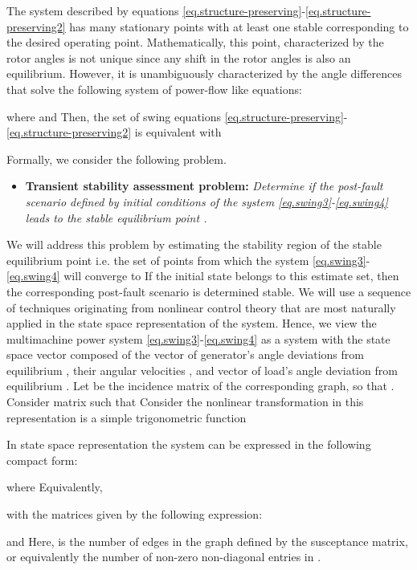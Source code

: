\documentclass[final]{IEEEtran}
\begin{document}
The system described by equations \eqref{eq.structure-preserving}-\eqref{eq.structure-preserving2} has many stationary points with
at least one stable corresponding to the desired operating point.
Mathematically, this point, characterized by the rotor angles
 is not unique
since any shift in the rotor angles
 is also an
equilibrium. However, it is unambiguously characterized by the
angle differences  that solve
the following system of power-flow like equations:

where  and 
Then, the set of swing equations \eqref{eq.structure-preserving}-\eqref{eq.structure-preserving2} is
equivalent with


Formally, we consider the following problem.

\begin{itemize}
\item [] \textbf{Transient stability assessment problem:} \emph{Determine if the post-fault scenario defined by
initial conditions  of the system \eqref{eq.swing3}-\eqref{eq.swing4} leads to the stable
equilibrium point .}
\end{itemize}




We will address this problem by estimating the stability region of the stable equilibrium point 
i.e. the set of points from which the system \eqref{eq.swing3}-\eqref{eq.swing4} will converge to  If the initial state  belongs to this estimate set,
then the corresponding post-fault scenario is determined stable.
We will use a sequence of techniques
originating from nonlinear control theory that are most naturally
applied in the state space representation of the system. Hence, we
view the multimachine power system \eqref{eq.swing3}-\eqref{eq.swing4} as a system
with the state space vector 
composed of the vector of generator's angle deviations from equilibrium , their
angular velocities , and vector of load's angle deviation from equilibrium
. 
Let  be the
incidence matrix of the corresponding graph, so that
. Consider matrix  such that   Consider the nonlinear transformation  in this
representation is a simple trigonometric function 

In
state space representation the system can be expressed in the
following compact form:

where 
Equivalently,

with the matrices  given by the following expression:

and 
Here,  is the number of edges in the graph defined
by the susceptance matrix, or equivalently the
number of non-zero non-diagonal entries in .  
\end{document}
